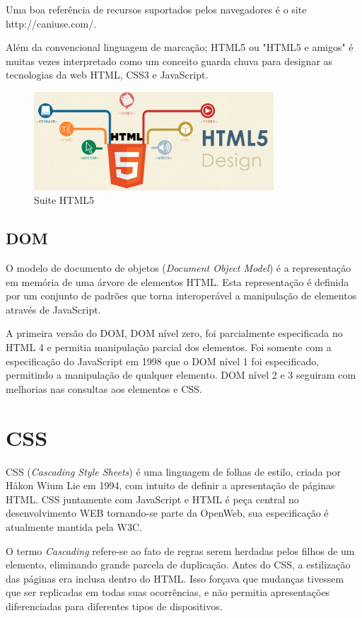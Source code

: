 \documentclass[
12pt,
a4paper,
portuges,
draft
]{report}
\begin{document}
Uma boa referência de recursos suportados pelos navegadores é o site
http://caniuse.com/.

Além da convencional linguagem de marcação; HTML5 ou "HTML5 e amigos"
é muitas vezes interpretado como um conceito guarda chuva para designar
as tecnologias da web HTML, CSS3 e JavaScript.

\begin{figure}
    \centering
    \includegraphics[width=0.8\textwidth,natwidth=610,natheight=642]{html5.jpg}
	\caption{Suite HTML5}
\end{figure}
\subsection{DOM}

O modelo de documento de objetos (\textit{Document Object Model}) é a representação
em memória de uma árvore de elementos HTML. Esta representação é definida por
um conjunto de padrões que torna interoperável a manipulação de elementos através de
JavaScript.

A primeira versão do DOM, DOM nível zero, foi parcialmente
especificada no HTML 4 e permitia manipulação parcial dos elementos.
Foi somente com a especificação do JavaScript em 1998 que o DOM nível 1 foi especificado,
permitindo a manipulação de qualquer elemento. DOM nível 2 e 3 seguiram com melhorias nas
consultas aos elementos e CSS.

\section{CSS}

CSS (\textit{Cascading Style Sheets}) é uma linguagem de folhas de
estilo, criada por Håkon Wium Lie em 1994, com intuito de definir a
apresentação de páginas HTML. CSS juntamente com JavaScript e HTML
é peça central no desenvolvimento WEB tornando-se parte da OpenWeb,
sua especificação é atualmente mantida pela W3C.

O termo \textit{Cascading} refere-se ao fato de regras serem herdadas
pelos filhos de um elemento, eliminando grande parcela de duplicação.
Antes do CSS, a estilização das páginas era inclusa dentro do HTML.
Isso forçava que mudanças tivessem que ser replicadas em todas suas
ocorrências, e não permitia apresentações diferenciadas para
diferentes tipos de dispositivos.
\end{document}

